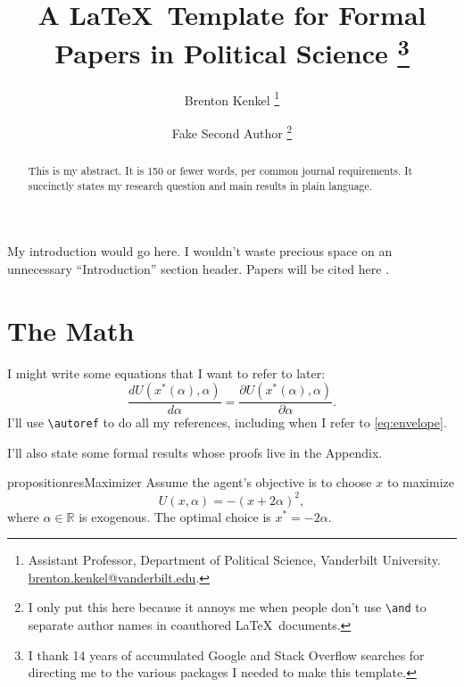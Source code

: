 \documentclass[12pt]{article}
\title{A \LaTeX\ Template for Formal Papers in Political Science%
  \thanks{I thank 14 years of accumulated Google and Stack Overflow searches for directing me to the various packages I needed to make this template.}
}
\author{Brenton Kenkel%
  \thanks{Assistant Professor, Department of Political Science, Vanderbilt University. \url{brenton.kenkel@vanderbilt.edu}.}
  \and Fake Second Author%
  \thanks{I only put this here because it annoys me when people don't use \texttt{\textbackslash{}and} to separate author names in coauthored \LaTeX\ documents.}
}
\begin{document}

\setcounter{page}{0}
\maketitle
\thispagestyle{empty}

\begin{abstract}
  This is my abstract.
  It is 150 or fewer words, per common journal requirements.
  It succinctly states my research question and main results in plain language.
\end{abstract}


\clearpage
\doublespacing

My introduction would go here.
I wouldn't waste precious space on an unnecessary ``Introduction'' section header.
Papers will be cited here \citep{walter1997critical}.

\section{The Math}

I might write some equations that I want to refer to later:
\begin{equation}
  \label{eq:envelope}
  \frac{d U(x^*(\alpha), \alpha)}{d \alpha} = \frac{\partial U(x^*(\alpha), \alpha)}{\partial \alpha}.
\end{equation}
I'll use \verb|\autoref| to do all my references, including when I refer to \autoref{eq:envelope}.

I'll also state some formal results whose proofs live in the Appendix.

\begin{restatable}{proposition}{resMaximizer}
  \label{res:maximizer}
  Assume the agent's objective is to choose $x$ to maximize
  \begin{displaymath}
    U(x, \alpha) = - (x + 2 \alpha)^2,
  \end{displaymath}
  where $\alpha \in \mathbb{R}$ is exogenous.
  The optimal choice is $x^* = - 2 \alpha$.
\end{restatable}
\end{document}
